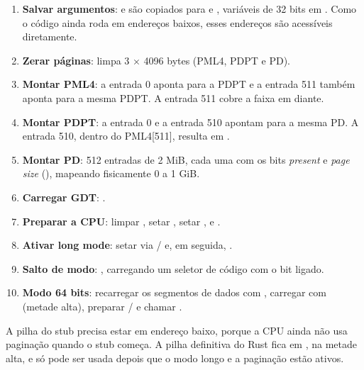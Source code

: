 \begin{enumerate}
  \item \textbf{Salvar argumentos}:  e  s\~ao copiados
        para  e , vari\'aveis de 32 bits em
        . Como o c\'odigo ainda roda em endere\c{c}os baixos,
        esses endere\c{c}os s\~ao acess\'iveis diretamente.
  \item \textbf{Zerar p\'aginas}:  limpa 3 $\times$ 4096
        bytes (PML4, PDPT e PD).
  \item \textbf{Montar PML4}: a entrada 0 aponta para a PDPT e a entrada 511
        tamb\'em aponta para a mesma PDPT. A entrada 511 cobre a faixa
         em diante.
  \item \textbf{Montar PDPT}: a entrada 0 e a entrada 510 apontam para a
        mesma PD. A entrada 510, dentro do PML4[511], resulta em
        .
  \item \textbf{Montar PD}: 512 entradas de 2 MiB, cada uma com os bits
        \emph{present} e \emph{page size} (),
        mapeando fisicamente 0 a 1 GiB.
  \item \textbf{Carregar GDT}: .
  \item \textbf{Preparar a CPU}: limpar , setar ,
        setar ,  e .
  \item \textbf{Ativar long mode}: setar  via  /
         e, em seguida, .
  \item \textbf{Salto de modo}: ,
        carregando um seletor de c\'odigo com o bit  ligado.
  \item \textbf{Modo 64 bits}: recarregar os segmentos de dados com
        , carregar  com  (metade alta),
        preparar / e chamar .
\end{enumerate}

\begin{nota}
A pilha do stub precisa estar em endere\c{c}o baixo, porque a CPU ainda n\~ao
usa pagina\c{c}\~ao quando o stub come\c{c}a. A pilha definitiva do Rust fica
em , na metade alta, e s\'o pode ser usada depois que o modo longo
e a pagina\c{c}\~ao est\~ao ativos.
\end{nota}

